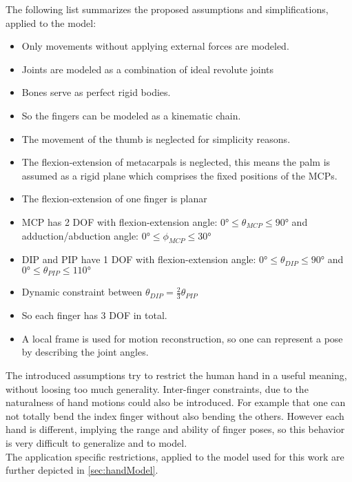 The following list summarizes the proposed assumptions and simplifications, applied to the model:
\begin{itemize}
\item Only movements without applying external forces are modeled.
\item Joints are modeled as a combination of ideal revolute joints
\item Bones serve as perfect rigid bodies.
\item So the fingers can be modeled as a kinematic chain.
\item The movement of the thumb is neglected for simplicity reasons.
\item The flexion-extension of metacarpals is neglected, this means the palm is assumed as a rigid plane which comprises the fixed positions of the \acp{MCP}.
\item The flexion-extension of one finger is planar
\item \ac{MCP} has 2 \ac{DOF} with flexion-extension angle: $ \ang{0} \leq \theta_{MCP} \leq \ang{90} $ and adduction/abduction angle: $ \ang{0} \leq \phi_{MCP} \leq \ang{30} $
\item \ac{DIP} and \ac{PIP} have 1 DOF with flexion-extension angle: $ \ang{0} \leq \theta_{DIP} \leq \ang{90} $ and $ \ang{0} \leq \theta_{PIP} \leq \ang{110} $
\item Dynamic constraint between $ \theta_{DIP} = \frac{2}{3} \theta_{PIP} $
\item So each finger has 3 \ac{DOF} in total.
\item A local frame is used for motion reconstruction, so one can represent a pose by describing the joint angles.
\end{itemize}

The introduced assumptions try to restrict the human hand in a useful meaning, without loosing too much generality. Inter-finger constraints, due to the naturalness of hand motions could also be introduced. For example that one can not totally bend the index finger without also bending the others. However each hand is different, implying the range and ability of finger poses, so this behavior is very difficult to generalize and to model.\\
The application specific restrictions, applied to the model used for this work are further depicted in \ref{sec:handModel}.




